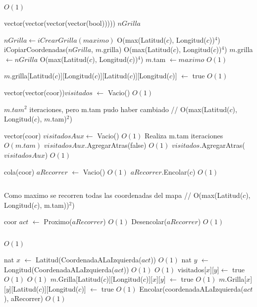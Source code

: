 \begin{Algoritmos}
\begin{algorithmic}[1]
\State {} \Comment $O(1)$

\State vector(vector(vector(vector(bool))))) $nGrilla$

\State $nGrilla \gets iCrearGrilla(maximo)$ \Comment O(max(Latitud($c$), Longitud($c$))$^4$)
\State iCopiarCoordenadas($nGrilla$, $m$.grilla) \Comment O(max(Latitud($c$), Longitud($c$))$^4$)
\State $m$.grilla $\gets nGrilla$ \Comment O(max(Latitud($c$), Longitud($c$))$^4$)
\State $m$.tam $\gets maximo$ \Comment $O(1)$

\EndIf

\State $m$.grilla[Latitud($c$)][Longitud($c$)][Latitud($c$)][Longitud($c$)] $\gets$ true \Comment $O(1)$
\State $ $


\State vector(vector(coor))$visitados$ $\gets$ Vacio() \Comment $O(1)$

	    \Comment $m.tam^2$ iteraciones, pero m.tam pudo haber cambiado // O(max(Latitud($c$), Longitud($c$), $m$.tam)$^2$)

	\State vector(coor) $visitadosAux \gets$ Vacio()  \Comment $O(1)$	
	      \Comment Realiza m.tam iteraciones $O(m.tam)$
		\State $visitadosAux$.AgregarAtras(false) \Comment $O(1)$
	\EndFor
	\State $visitados$.AgregarAtras($visitadosAux$) \Comment $O(1)$
\EndFor


\State cola(coor) $aRecorrer$ $\gets$ Vacio() \Comment $O(1)$
\State $aRecorrer$.Encolar($c$) \Comment $O(1)$

\State $ $

 \Comment Como maximo se recorren todas las coordenadas del mapa // O(max(Latitud($c$), Longitud($c$), m.tam))$^2$)

\State coor $act$ $\gets$ Proximo($aRecorrer$) \Comment  $O(1)$
\State Desencolar($aRecorrer$) \Comment $O(1)$

\State $ $




      \Comment $O(1)$

\State nat $x$ $\gets$ Latitud(CoordenadaALaIzquierda($act$))   \Comment $O(1)$
\State nat $y$ $\gets$ Longitud(CoordenadaALaIzquierda($act$))  \Comment $O(1)$
    \Comment $O(1)$
\State visitados[$x$][$y$]$ \gets$ true    \Comment $O(1)$
	 	\Comment $O(1)$
		\State $m$.Grilla[Latitud($c$)][Longitud($c$)][$x$][$y$] $ \gets $ true \Comment $O(1)$
		\State $m$.Grilla[$x$][$y$][Latitud($c$)][Longitud($c$)] $ \gets $ true \Comment $O(1)$
		\State Encolar(coordenadaALaIzquierda($act$), aRecorrer) \Comment $O(1)$	
	\EndIf
\EndIf
\EndIf


\end{algorithmic}
\end{Algoritmos}
